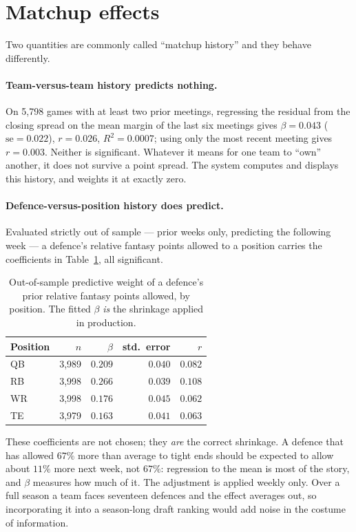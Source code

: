 \documentclass[11pt,a4paper]{article}
\begin{document}
\section{Matchup effects}

Two quantities are commonly called ``matchup history'' and they behave
differently.

\paragraph{Team-versus-team history predicts nothing.}
On 5{,}798 games with at least two prior meetings, regressing the residual from
the closing spread on the mean margin of the last six meetings gives
$\beta = 0.043$ ($\mathrm{se} = 0.022$), $r = 0.026$, $R^2 = 0.0007$; using only
the most recent meeting gives $r = 0.003$. Neither is significant. Whatever it
means for one team to ``own'' another, it does not survive a point spread. The
system computes and displays this history, and weights it at exactly zero.

\paragraph{Defence-versus-position history does predict.}
Evaluated strictly out of sample --- prior weeks only, predicting the following
week --- a defence's relative fantasy points allowed to a position carries the
coefficients in Table~\ref{tab:matchup}, all significant.

\begin{table}[t]
\centering
\caption{Out-of-sample predictive weight of a defence's prior relative fantasy
points allowed, by position. The fitted $\beta$ \emph{is} the shrinkage applied
in production.}
\label{tab:matchup}
\begin{tabular}{lrrrr}
\toprule
Position & $n$ & $\beta$ & std.\ error & $r$ \\
\midrule
QB & 3{,}989 & $0.209$ & $0.040$ & $0.082$ \\
RB & 3{,}998 & $0.266$ & $0.039$ & $0.108$ \\
WR & 3{,}998 & $0.176$ & $0.045$ & $0.062$ \\
TE & 3{,}979 & $0.163$ & $0.041$ & $0.063$ \\
\bottomrule
\end{tabular}
\end{table}

These coefficients are not chosen; they \emph{are} the correct shrinkage. A
defence that has allowed $67\%$ more than average to tight ends should be
expected to allow about $11\%$ more next week, not $67\%$: regression to the
mean is most of the story, and $\beta$ measures how much of it. The adjustment
is applied weekly only. Over a full season a team faces seventeen defences and
the effect averages out, so incorporating it into a season-long draft ranking
would add noise in the costume of information.
\end{document}
